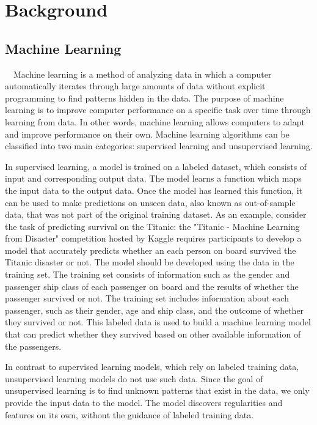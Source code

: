 \chapter{Background}

\section{Machine Learning}

　Machine learning is a method of analyzing data in which a 
computer automatically iterates through large amounts of data 
without explicit programming to find patterns hidden in the data. 
The purpose of machine learning is to improve computer performance 
on a specific task over time through learning from data.
In other words, machine learning allows computers to adapt 
and improve performance on their own. 
Machine learning algorithms can be classified into two main 
categories: supervised learning and unsupervised learning. 

In supervised learning, a model is trained on a labeled dataset,
which consists of input and corresponding output data. The model 
learns a function which maps the input data to the output data.
Once the model has learned this function, it can be used to make
predictions on unseen data, also known as out-of-sample data, 
that was not part of the original training dataset.
As an example, consider the task of predicting survival on the 
Titanic: the "Titanic - Machine Learning from Disaster" 
competition hosted by Kaggle \cite{titanic} requires participants 
to develop a model that accurately predicts whether an each person
on board survived the Titanic disaster or not. 
The model should be developed using the data in the training set.
The training set consists of information such as the gender and 
passenger ship class of each passenger on board and the results of 
whether the passenger survived or not.
The training set includes information about each passenger, such 
as their gender, age and ship class, and the outcome of whether 
they survived or not. This labeled data is used to build a machine
learning model that can predict whether they survived based on 
other available information of the passengers.

In contrast to supervised learning models, which rely on labeled 
training data, unsupervised learning models do not use such data.
Since the goal of unsupervised learning is to find unknown patterns
that exist in the data, we only provide the input data to the model.
The model discovers regularities and features on its own, without
the guidance of labeled training data.

